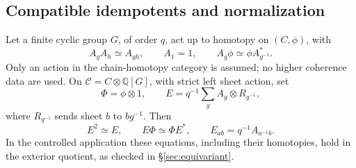 \documentclass[11pt]{amsart}
\numberwithin{equation}{section}
\theoremstyle{definition}
\theoremstyle{remark}
\newcommand{\Q}{\mathbb Q}
\begin{document}
\subsection{Compatible idempotents and normalization}
Let a finite cyclic group $G$, of order $q$, act up to homotopy on
$(C,\phi)$, with
\begin{equation}\label{alg:grouprelations}
 A_gA_h\simeq A_{gh},\qquad A_1=1,\qquad
 A_g\phi\simeq\phi A_{g^{-1}}^*.
\end{equation}
Only an action in the chain-homotopy category is assumed; no higher
coherence data are used.
On $\mathcal C=C\otimes\Q[G]$, with strict left sheet action, set
\begin{equation}\label{alg:graphidempotent}
 \Phi=\phi\otimes1,\qquad
 E=q^{-1}\sum_gA_g\otimes R_{g^{-1}},
\end{equation}
where $R_{g^{-1}}$ sends sheet $b$ to $bg^{-1}$. Then
\begin{equation}\label{alg:graphrelations}
 E^2\simeq E,\qquad E\Phi\simeq\Phi E^*,\qquad
 E_{ab}=q^{-1}A_{a^{-1}b}.
\end{equation}
In the controlled application these equations, including their homotopies,
hold in the exterior quotient, as checked in \S\ref{sec:equivariant}.
\end{document}
